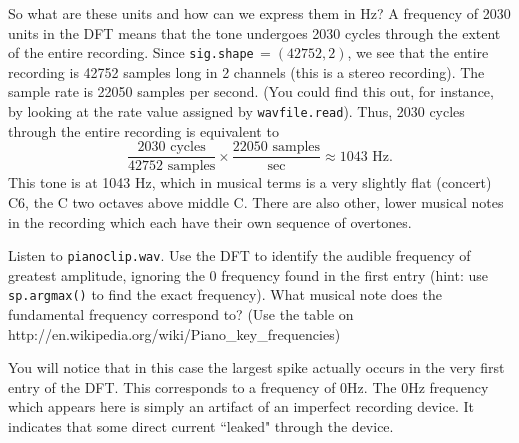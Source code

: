 So what are these units and how can we express them in Hz? 
A frequency of 2030 units in the DFT means that the tone undergoes 2030 cycles through the extent of the entire recording. 
Since \texttt{sig.shape}$\, = (42752, 2)$, we see that the entire recording is 42752 samples long in 2 channels (this is a stereo recording).
The sample rate is 22050 samples per second.
(You could find this out, for instance, by looking at the rate value assigned by \texttt{wavfile.read}). 
Thus, 2030 cycles through the entire recording is equivalent to
$$\frac{2030\text{ cycles}}{42752\text{ samples}} \times \frac{22050\text{ samples}}{\text{sec}} \approx 1043 \text{ Hz}.$$
This tone is at 1043 Hz, which in musical terms is a very slightly flat (concert) C6, the C two octaves above middle C.
There are also other, lower musical notes in the recording which each have their own sequence of overtones.

\begin{problem} %
Listen to \texttt{pianoclip.wav}.
Use the DFT to identify the audible frequency of greatest amplitude, ignoring the 0 frequency found in the first entry (hint: use \texttt{sp.argmax()} to find the exact frequency).
What musical note does the fundamental frequency correspond to?
(Use the table on http://en.wikipedia.org/wiki/Piano\_key\_frequencies)
\end{problem}

You will notice that in this case the largest spike actually occurs in the very first entry of the DFT.
This corresponds to a frequency of 0Hz.
The 0Hz frequency which appears here is simply an artifact of an imperfect recording device.
It indicates that some direct current ``leaked" through the device.



